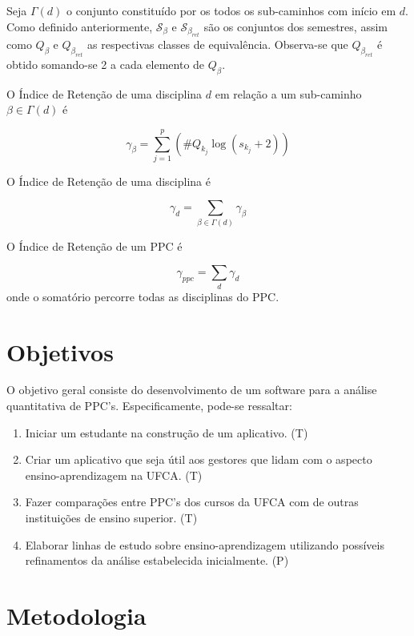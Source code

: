 \documentclass[a4paper, 12pt]{article}
\begin{document}
Seja $\Gamma(d)$ o conjunto constituído por os todos os sub-caminhos com início em $d$. Como definido anteriormente, $\mathcal{S}_\beta$ e 
$\mathcal{S}_{\beta_{ret}}$ são os conjuntos dos semestres, assim como $Q_\beta$ e $Q_{\beta_{ret}}$ as respectivas classes de 
equivalência. Observa-se que $Q_{\beta_{ret}}$ é obtido somando-se 2 a cada elemento de $Q_\beta$.

\begin{definicao}
O Índice de Retenção de uma disciplina $d$ em relação a um sub-caminho $\beta \in \Gamma(d)$ é

$$ \gamma_{\beta} = \sum_{j = 1}^{p}(\#Q_{k_j} \log(s_{k_j}+2)) $$
\end{definicao}

\begin{definicao}
O Índice de Retenção de uma disciplina é

$$ \gamma_d = \sum_{\beta \in \Gamma(d)} \gamma_\beta $$
\end{definicao}

\begin{definicao}
O Índice de Retenção de um PPC é

$$ \gamma_{ppc} = \sum_{d} \gamma_d $$
onde o somatório percorre todas as disciplinas do PPC.
\end{definicao}

\section*{Objetivos}

O objetivo geral consiste do desenvolvimento de um software para a análise quantitativa de PPC's. Especificamente, pode-se ressaltar: 

\begin{enumerate}
\item Iniciar um estudante na construção de um aplicativo. (T)
\item Criar um aplicativo que seja útil aos gestores que lidam com o aspecto ensino-aprendizagem na UFCA. (T)
\item Fazer comparações entre PPC's dos cursos da UFCA com de outras instituições de ensino superior. (T)
\item Elaborar linhas de estudo sobre ensino-aprendizagem utilizando possíveis refinamentos da análise estabelecida inicialmente. (P)
\end{enumerate}

\section*{Metodologia}
\end{document}
